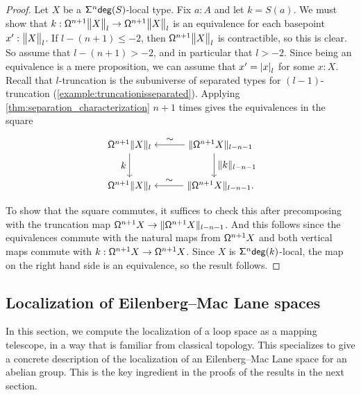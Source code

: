 \begin{proof}
    Let $X$ be a $\suspsym^n \degg(S)$-local type.
    Fix $a : A$ and let $k = S(a)$.
    We must show that $k : \loopspacesym^{n+1} \ttrunc{l}{X} \to \loopspacesym^{n+1} \ttrunc{l}{X}$
    is an equivalence for each basepoint $x' : \ttrunc{l}{X}$.
    If $l - (n+1) \leq -2$, then $\loopspacesym^{n+1} \ttrunc{l}{X}$ is
    contractible, so this is clear.
    So assume that $l - (n+1) > -2$, and in particular that $l > -2$.
    Since being an equivalence is a mere proposition,
    we can assume that $x' = \tproj{l}{x}$ for some $x : X$.
    Recall that $l$-truncation
    is the subuniverse of separated types for $(l-1)$-truncation (\cref{example:truncationisseparated}).
    Applying \cref{thm:separation_characterization} $n+1$ times gives the equivalences
    in the square
\[
        \begin{tikzpicture}
          \matrix (m) [matrix of math nodes,row sep=2.5em,column sep=3em,minimum width=2em]
          { \loopspacesym^{n+1} \trunc{l}X & \trunc{l-n-1}{\loopspacesym^{n+1} X}\hspace*{-3ex} \\
            \loopspacesym^{n+1} \trunc{l} X & \trunc{l-n-1}{\loopspacesym^{n+1} X} . \hspace*{-3ex} \\};
          \path[->]
            (m-1-1) edge node [left] {$k$} (m-2-1)
            (m-2-2) edge node [above] {$\sim$} (m-2-1)
            (m-1-2) edge node [right]{$\trunc{l-n-1}{k}$} (m-2-2)
                    edge node [above] {$\sim$} (m-1-1)
            ;
        \end{tikzpicture}
    \]
    To show that the square commutes, it suffices to check this after precomposing
    with the truncation map $\loopspacesym^{n+1} X \to \trunc{l-n-1}{\loopspacesym^{n+1} X}$.
    And this follows since the equivalences commute with the natural maps from
    $\loopspacesym^{n+1} X$ and
    both vertical maps commute with $k : \loopspacesym^{n+1} X \to \loopspacesym^{n+1} X$.
    Since $X$ is $\suspsym^n \degg(k)$-local, the map on the right hand side is an equivalence,
    so the result follows.
\end{proof}

\subsection{Localization of Eilenberg--Mac Lane spaces}\label{ss:localizingKgn}

In this section, we compute the localization of a loop space as a mapping telescope,
in a way that is familiar from classical topology.
This specializes to give a concrete description of the
localization of an Eilenberg--Mac Lane space for an abelian group.
This is the key ingredient in the proofs of the results in the next section.

